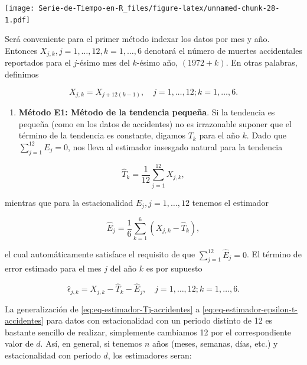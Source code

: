\documentclass[12pt,]{krantz}
\providecommand{\tightlist}{%
  \setlength{\itemsep}{0pt}\setlength{\parskip}{0pt}}
\theoremstyle{definition}
\theoremstyle{definition}
\theoremstyle{definition}
\theoremstyle{remark}
\begin{document}
\texttt{[image: Serie-de-Tiempo-en-R\_files/figure-latex/unnamed-chunk-28-1.pdf]}

Será conveniente para el primer método indexar los datos por mes y año.
Entonces \(X_{j,k}, j=1,\ldots,12, k=1,\ldots,6\) denotará el número de
muertes accidentales reportados para el \(j\)-ésimo mes del \(k\)-ésimo
año, \((1972+k)\). En otras palabras, definimos

\[X_{j,k}=X_{j+12(k-1)},\quad j=1,\ldots,12; k=1,\ldots,6.\]

\begin{enumerate}
\def\labelenumi{\arabic{enumi})}
\tightlist
\item
  \textbf{Método E1: Método de la tendencia pequeña}. Si la tendencia es
  pequeña (como en los datos de accidentes) no es irrazonable suponer
  que el término de la tendencia es constante, digamos \(T_k\) para el
  año \(k\). Dado que \(\sum_{j=1}^{12}E_j=0\), nos lleva al estimador
  insesgado natural para la tendencia
\end{enumerate}

\begin{equation}
\hat{T}_k = \frac{1}{12}\sum_{j=1}^{12}X_{j,k},
\label{eq:eq-estimador-Tj-accidentes}
\end{equation}

mientras que para la estacionalidad \(E_j, j=1,\ldots,12\) tenemos el
estimador

\begin{equation}
\hat{E}_j = \frac{1}{6}\sum_{k=1}^6(X_{j,k}-\hat{T}_k),
\label{eq:eq-estimador-Et-accidentes}
\end{equation}

el cual automáticamente satisface el requisito de que
\(\sum_{j=1}^{12}\hat{E}_j=0\). El término de error estimado para el mes
\(j\) del año \(k\) es por supuesto

\begin{equation}
\hat{\epsilon}_{j,k} = X_{j,k}-\hat{T}_k-\hat{E}_j, \quad j=1,\ldots,12; k=1,\ldots,6.
\label{eq:eq-estimador-epsilon-t-accidentes}
\end{equation}

La generalización de \eqref{eq:eq-estimador-Tj-accidentes} a
\eqref{eq:eq-estimador-epsilon-t-accidentes} para datos con estacionalidad
con un periodo distinto de 12 es bastante sencillo de realizar,
simplemente cambiamos 12 por el correspondiente valor de \(d\). Así, en
general, si tenemos \(n\) años (meses, semanas, días, etc.) y
estacionalidad con periodo \(d\), los estimadores seran:
\end{document}
